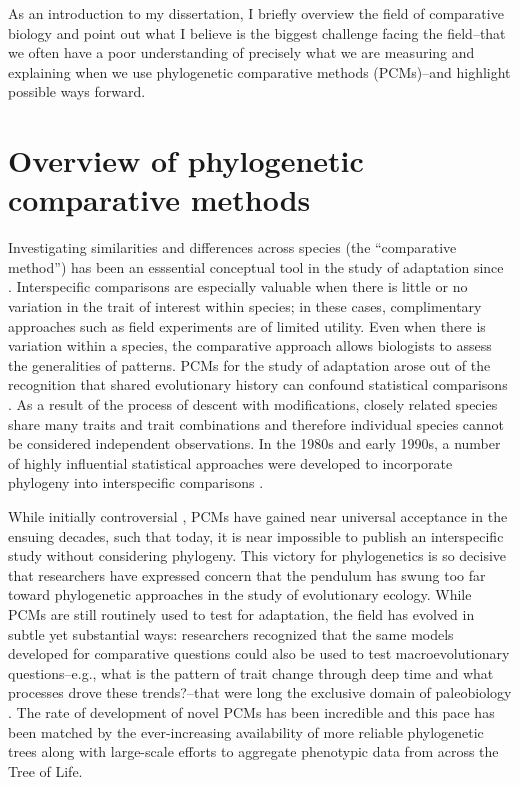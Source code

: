 As an introduction to my dissertation, I briefly overview the field of comparative biology \citep[for a more comprehensive discussion, see][]{PennellHarmon} and point out what I believe is the biggest challenge facing the field--that we often have a poor understanding of precisely what we are measuring and explaining when we use phylogenetic comparative methods (PCMs)--and highlight possible ways forward.

\section{Overview of phylogenetic comparative methods}

Investigating similarities and differences across species (the ``comparative method'') has been an esssential conceptual tool in the study of adaptation since \citet{Darwin1859}. Interspecific comparisons are especially valuable when there is little or no variation in the trait of interest within species; in these cases, complimentary approaches such as field experiments are of limited utility. Even when there is variation within a species, the comparative approach allows biologists to assess the generalities of patterns. PCMs for the study of adaptation arose out of the recognition that shared evolutionary history can confound statistical comparisons \citep{HarveyPagel1991}. As a result of the process of descent with modifications, closely related species share many traits and trait combinations and therefore individual species cannot be considered independent observations. In the 1980s and early 1990s, a number of highly influential statistical approaches were developed to incorporate phylogeny into interspecific comparisons \citep{Ridley1983, Felsenstein1985, Grafen1989, Maddison1990, HarveyPagel1991, Lynch1991, Pagel1994}. 

While initially controversial \citep[e.g.,][]{Westoby1995}, PCMs have gained near universal acceptance in the ensuing decades, such that today, it is near impossible to publish an interspecific study without considering phylogeny. This victory for phylogenetics is so decisive that researchers have expressed concern that the pendulum has swung too far toward phylogenetic approaches \citep{Losos2011} in the study of evolutionary ecology. While PCMs are still routinely used to test for adaptation, the field has evolved in subtle yet substantial ways: researchers recognized that the same models developed for comparative questions could also be used to test macroevolutionary questions--e.g., what is the pattern of trait change through deep time and what processes drove these trends?--that were long the exclusive domain of paleobiology \citep{HansenMartins1996, Hansen1997, Schluter1997, Pagel1997, MooersSchluter1998, Pagel1999, Mooers1999}. The rate of development of novel PCMs has been incredible and this pace has been matched by the ever-increasing availability of more reliable phylogenetic trees along with large-scale efforts to aggregate phenotypic data from across the Tree of Life.

